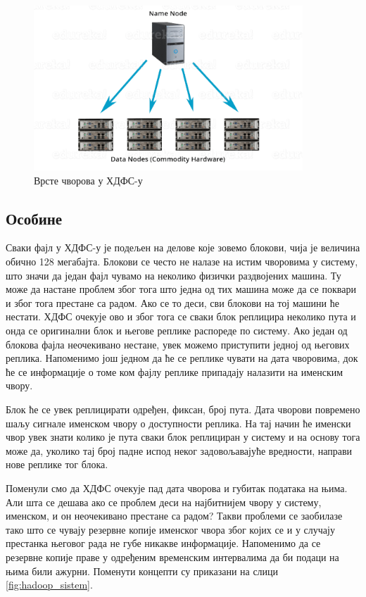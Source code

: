 \documentclass[12pt,oneside]{memoir}
\begin{document}
\begin{figure}[!ht]
  \centering
  \includegraphics[width=0.9\textwidth]{pictures/hdfs_nodovi.png}
  \caption{Врсте чворова у ХДФС-у}
  \label{fig:hadoop_nodovi}
\end{figure}

\subsection{Особине}
\label{subsec:hdfs_osobine}

Сваки фајл у ХДФС-у је подељен на делове које зовемо блокови, чија је величина обично 128 мегабајта. Блокови се често не налазе на истим чворовима у систему, што значи да један фајл чувамо на неколико физички раздвојених машина. Ту може да настане проблем због тога што једна од тих машина може да се поквари и због тога престане са радом. Ако се то деси, сви блокови на тој машини ће нестати. ХДФС очекује ово и због тога се сваки блок реплицира неколико пута и онда се оригинални блок и његове реплике распореде по систему. Ако један од блокова фајла неочекивано нестане, увек можемо приступити једној од његових реплика. Напоменимо још једном да ће се реплике чувати на дата чворовима, док ће се информације о томе ком фајлу реплике припадају налазити на именским чвору. \cite{hadoop_arch_guide}

Блок ће се увек реплицирати одређен, фиксан, број пута. Дата чворови повремено шаљу сигнале именском чвору о доступности реплика. На тај начин ће именски чвор увек знати колико је пута сваки блок реплициран у систему и на основу тога може да, уколико тај број падне испод неког задовољавајуће вредности, направи нове реплике тог блока. \cite{hadoop_arch_guide}

Поменули смо да ХДФС очекује пад дата чворова и губитак података на њима. Али шта се дешава ако се проблем деси на најбитнијем чвору у систему, именском, и он неочекивано престане са радом? Такви проблеми се заобилазе тако што се чувају резервне копије именског чвора због којих се и у случају престанка његовог рада не губе никакве информације. Напоменимо да се резервне копије праве у одређеним временским интервалима да би подаци на њима били ажурни. Поменути концепти су приказани на слици \ref{fig:hadoop_sistem}.
\end{document}
